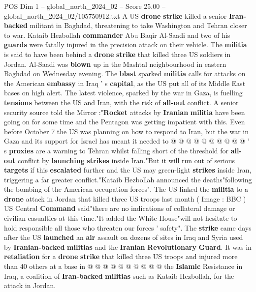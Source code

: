 \begin{textsample}{POS Dim 1 – global\_north\_2024\_02 – Score 25.00 – global\_north\_2024\_02/105750912.txt}  \label{ex:f1_pos_274}
A US \textbf{drone} \textbf{strike} killed a senior \textbf{Iran-backed} militant in Baghdad, threatening to take Washington and Tehran closer to war.
Kataib Hezbollah \textbf{commander} Abu Baqir Al-Saadi and two of his \textbf{guards} were fatally injured in the precision attack on their vehicle.
The \textbf{militia} is said to have been behind a \textbf{drone} \textbf{strike} that killed three US soldiers in Jordan.
Al-Saadi was \textbf{blown} up in the Mashtal neighbourhood in eastern Baghdad on Wednesday evening.
The \textbf{blast} sparked \textbf{militia} calls for attacks on the American \textbf{embassy} in Iraq ' s \textbf{capital}, as the US put all of its Middle East bases on high alert.
The latest violence, sparked by the war in Gaza, is fuelling \textbf{tensions} between the US and Iran, with the risk of \textbf{all-out} conflict.
A senior security source told the Mirror :"\textbf{Rocket} attacks by \textbf{Iranian} \textbf{militia} have been going on for some time and the Pentagon was getting impatient with this.
Even before October 7 the US was planning on how to respond to Iran, but the war in Gaza and its support for Israel has meant it needed to @ @ @ @ @ @ @ @ @ @ ' s \textbf{proxies} are a warning to Tehran whilst falling short of the threshold for \textbf{all-out} conflict by \textbf{launching} \textbf{strikes} inside Iran."But it will run out of serious \textbf{targets} if this \textbf{escalated} further and the US may green-light \textbf{strikes} inside Iran, triggering a far greater conflict."Kataib Hezbollah announced the deaths"following the bombing of the American occupation forces".
The US linked the \textbf{militia} to a \textbf{drone} attack in Jordan that killed three US troops last month ( Image : BBC ) US Central \textbf{Command} said"there are no indications of collateral damage or civilian casualties at this time."It added the White House"will not hesitate to hold responsible all those who threaten our forces ' safety".
The \textbf{strike} came days after the US \textbf{launched} an \textbf{air} assault on dozens of sites in Iraq and Syria used by \textbf{Iranian-backed} \textbf{militias} and the \textbf{Iranian} \textbf{Revolutionary} \textbf{Guard}.
It was in \textbf{retaliation} for a \textbf{drone} \textbf{strike} that killed three US troops and injured more than 40 others at a base in @ @ @ @ @ @ @ @ @ @ the \textbf{Islamic} Resistance in Iraq, a coalition of \textbf{Iran-backed} \textbf{militias} such as Kataib Hezbollah, for the attack in Jordan.

\end{textsample}
